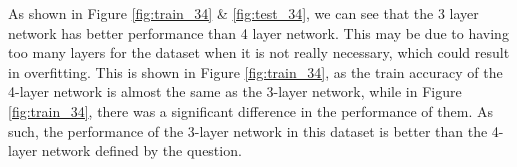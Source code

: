 As shown in Figure \ref{fig:train_34} \& \ref{fig:test_34}, we can see that the 3 layer network has better performance than 4 layer network. This may be due to having too many layers for the dataset when it is not really necessary, which could result in overfitting. This is shown in Figure \ref{fig:train_34}, as the train accuracy of the 4-layer network is almost the same as the 3-layer network, while in Figure \ref{fig:train_34}, there was a significant difference in the performance of them. As such, the performance of the 3-layer network in this dataset is better than the 4-layer network defined by the question.
